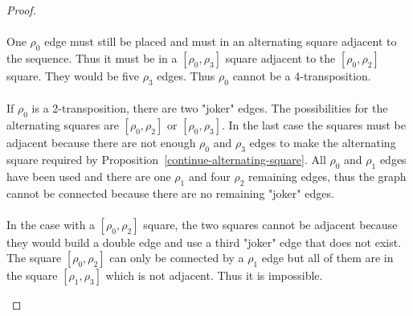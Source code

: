 \begin{proof}
\begin{figure}[H]
\begin{center}
\begin{tikzpicture}[scale=.8]
      \end{tikzpicture}
      \caption{}
    \end{center}
  \end{figure}

  \paragraph{}
  One $\rho_0$ edge must still be placed and must in an alternating square adjacent to the sequence. Thus it must be in a $[\rho_0, \rho_3]$ square adjacent to the $[\rho_0, \rho_2]$ square. They would be five $\rho_3$ edges. Thus $\rho_0$ cannot be a 4-transposition.

  \paragraph{}
  If $\rho_0$ is a 2-transposition, there are two "joker" edges. The possibilities for the alternating squares are $[\rho_0, \rho_2]$ or $[\rho_0, \rho_3]$. In the last case the squares must be adjacent because there are not enough $\rho_0$ and $\rho_3$ edges to make the alternating square required by Proposition~\ref{continue-alternating-square}. All $\rho_0$ and $\rho_1$ edges have been used and there are one $\rho_1$ and four $\rho_2$ remaining edges, thus the graph cannot be connected because there are no remaining "joker" edges.

  \paragraph{}
  In the case with a $[\rho_0, \rho_2]$ square, the two squares cannot be adjacent because they would build a double edge and use a third "joker" edge that does not exist. The square $[\rho_0, \rho_2]$ can only be connected by a $\rho_1$ edge but all of them are in the square $[\rho_1, \rho_3]$ which is not adjacent. Thus it is impossible.

  \begin{figure}[H]
    \begin{center}
\end{center}
\end{figure}
\end{proof}
